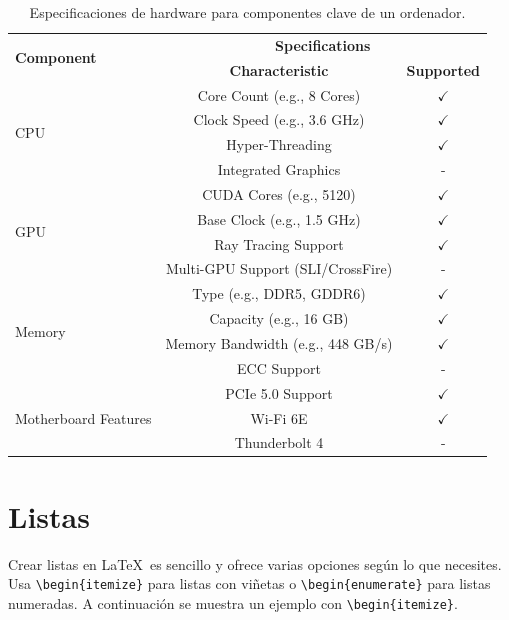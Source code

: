 \begin{table}[!htpb]
    \caption{Especificaciones de hardware para componentes clave de un ordenador.}
    \label{tab:table-04}
    \centering
    \begin{tabular}{lcc}
        \toprule
        \multirow{2}{*}{\textbf{Component}} & \multicolumn{2}{c}{\textbf{Specifications}} \\
        \cmidrule(lr){2-3}
        & \textbf{Characteristic} & \textbf{Supported} \\
        \midrule
        \multirow{4}{*}{CPU} & Core Count (e.g., 8 Cores) & $\checkmark$ \\
        & Clock Speed (e.g., 3.6 GHz) & $\checkmark$ \\
        & Hyper-Threading & $\checkmark$ \\
        & Integrated Graphics & - \\
        \midrule
        \multirow{4}{*}{GPU} & CUDA Cores (e.g., 5120) & $\checkmark$ \\
        & Base Clock (e.g., 1.5 GHz) & $\checkmark$ \\
        & Ray Tracing Support & $\checkmark$ \\
        & Multi-GPU Support (SLI/CrossFire) & - \\
        \midrule
        \multirow{4}{*}{Memory} & Type (e.g., DDR5, GDDR6) & $\checkmark$ \\
        & Capacity (e.g., 16 GB) & $\checkmark$ \\
        & Memory Bandwidth (e.g., 448 GB/s) & $\checkmark$ \\
        & ECC Support & - \\
        \midrule
        \multirow{3}{*}{Motherboard Features} & PCIe 5.0 Support & $\checkmark$ \\
        & Wi-Fi 6E & $\checkmark$ \\
        & Thunderbolt 4 & - \\
        \bottomrule
    \end{tabular}
\end{table}

\section{Listas}

Crear listas en \LaTeX\ es sencillo y ofrece varias opciones según lo que necesites. Usa \verb|\begin{itemize}| para listas con viñetas o \verb|\begin{enumerate}| para listas numeradas. A continuación se muestra un ejemplo con \verb|\begin{itemize}|.


